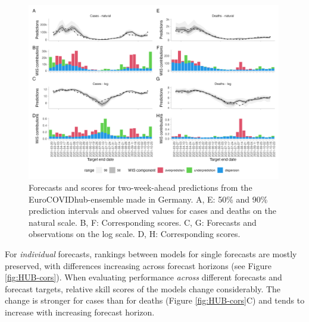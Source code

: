 \documentclass{article}
\begin{document}
\begin{figure}[h!]
    \centering
    \includegraphics[width=0.99\textwidth]{output/figures/HUB-model-comparison-ensemble.png}
    \caption{
    Forecasts and scores for two-week-ahead predictions from the EuroCOVIDhub-ensemble made in Germany. A, E: 50\% and 90\% prediction intervals and observed values for cases and deaths on the natural scale. B, F: Corresponding scores. C, G: Forecasts and observations on the log scale. D, H: Corresponding scores. 
    }
    \label{fig:HUB-model-comparison-ensemble}
\end{figure}


For \textit{individual} forecasts, rankings between models for single forecasts are mostly preserved, with differences increasing across forecast horizons (see Figure \ref{fig:HUB-cors}). When evaluating performance \textit{across} different forecasts and forecast targets, relative skill scores of the models change considerably. The change is stronger for cases than for deaths (Figure \ref{fig:HUB-cors}C) and tends to increase with increasing forecast horizon. 
\end{document}
